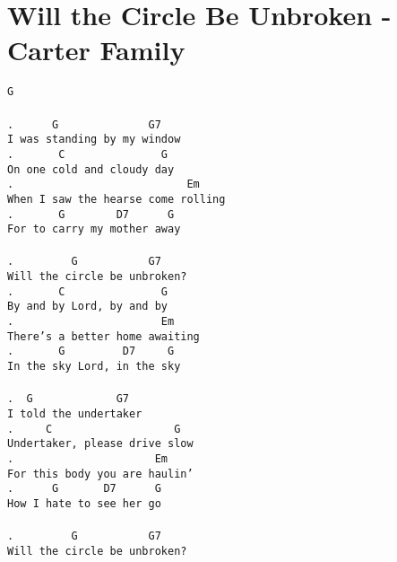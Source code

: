 \newpage
\section{Will the Circle Be Unbroken - Carter Family}
\label{Will the Circle Be Unbroken - Carter Family}
\texttt{G\\
\\
. \ \ \ \ \ G\ \ \ \ \ \ \ \ \ \ \ \ \ \ G7\\
I\ was\ standing\ by\ my\ window\\
. \ \ \ \ \ \ C\ \ \ \ \ \ \ \ \ \ \ \ \ \ \ G\\
On\ one\ cold\ and\ cloudy\ day\\
. \ \ \ \ \ \ \ \ \ \ \ \ \ \ \ \ \ \ \ \ \ \ \ \ \ \ Em\\
When\ I\ saw\ the\ hearse\ come\ rolling\\
. \ \ \ \ \ \ G\ \ \ \ \ \ \ \ D7\ \ \ \ \ \ G\\
For\ to\ carry\ my\ mother\ away\\
\\
. \ \ \ \ \ \ \ \ G\ \ \ \ \ \ \ \ \ \ \ G7\\
Will\ the\ circle\ be\ unbroken?\\
. \ \ \ \ \ \ C\ \ \ \ \ \ \ \ \ \ \ \ \ \ \ G\\
By\ and\ by\ Lord,\ by\ and\ by\\
. \ \ \ \ \ \ \ \ \ \ \ \ \ \ \ \ \ \ \ \ \ \ Em\\
There's\ a\ better\ home\ awaiting\\
. \ \ \ \ \ \ G\ \ \ \ \ \ \ \ \ D7\ \ \ \ \ G\\
In\ the\ sky\ Lord,\ in\ the\ sky\\
\\
. \ G\ \ \ \ \ \ \ \ \ \ \ \ \ G7\\
I\ told\ the\ undertaker\\
. \ \ \ \ C\ \ \ \ \ \ \ \ \ \ \ \ \ \ \ \ \ \ \ G\\
Undertaker,\ please\ drive\ slow\\
. \ \ \ \ \ \ \ \ \ \ \ \ \ \ \ \ \ \ \ \ \ Em\\
For\ this\ body\ you\ are\ haulin'\\
. \ \ \ \ \ G\ \ \ \ \ \ \ D7\ \ \ \ \ \ G\\
How\ I\ hate\ to\ see\ her\ go\\
\\
. \ \ \ \ \ \ \ \ G\ \ \ \ \ \ \ \ \ \ \ G7\\
Will\ the\ circle\ be\ unbroken?\\
}
